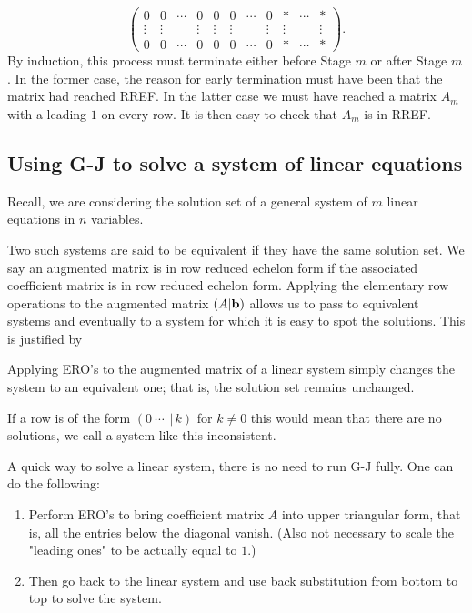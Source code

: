 \documentclass[10pt, a4paper]{article}
\begin{document}
\begin{enumerate}[label = (\roman*).]
\[\begin{pmatrix}
        0 & 0 & \dotsi & 0 & 0 & 0 & \dotsi & 0 & * & \dotsi & * \\
        \vdots & \vdots & \phantom{} & \vdots & \vdots & \vdots & \phantom{} & \vdots & \vdots & \phantom{} & \vdots \\
        0 & 0 & \dotsi & 0 & 0 & 0 & \dotsi & 0 & * & \dotsi & *
    \end{pmatrix}.
    \]
    By induction, this process must terminate either before Stage $m$ or after Stage $m$.
    In the former case,
    the reason for early termination must have been that the matrix had reached RREF.
    In the latter case we must have reached a matrix $A_m$ with a leading $1$ on every row.
    It is then easy to check that $A_m$ is in RREF.
\end{enumerate}

\subsection{Using G-J to solve a system of linear equations}
Recall, we are considering the solution set of a general system of $m$ linear equations in $n$ variables.

Two such systems are said to be equivalent if they have the same solution set.
We say an augmented matrix is in row reduced echelon form if the associated coefficient matrix is in row reduced echelon form.
Applying the elementary row operations to the augmented matrix $(A | \mathbf{b})$ allows us to pass to equivalent systems and eventually to a system for which it is easy to spot the solutions.
This is justified by
\begin{theorem}[label = thm:lintoech]\label{linalg_thm_lintoech}
    Applying ERO's to the augmented matrix of a linear system simply changes the system to an equivalent one; that is, the solution set remains unchanged.
\end{theorem}

If a row is of the form $(0\ \dotsi\ \,|\, k)$ for $k \neq 0$ this would mean that there are no solutions,
we call a system like this inconsistent.

A quick way to solve a linear system,
there is no need to run G-J fully.
One can do the following:
\begin{enumerate}[label = \arabic*) :]
    \item Perform ERO's to bring coefficient matrix $A$ into upper triangular form,
    that is, all the entries below the diagonal vanish.
    (Also not necessary to scale the "leading ones" to be actually equal to $1$.)
    \item Then go back to the linear system and use back substitution from bottom to top to solve the system.
\end{enumerate}
\end{document}
